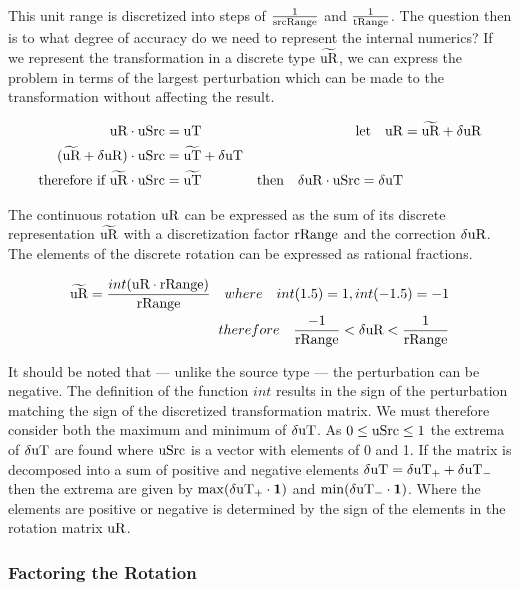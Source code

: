 This unit range is discretized into steps of $\frac{1}{\text{srcRange}}$ and $\frac{1}{\text{tRange}}$. The question then is to what degree of accuracy do we need to represent the internal numerics? If we represent the transformation in a discrete type $\widetilde{\text{uR}}$, we can express the problem in terms of the largest perturbation which can be made to the transformation without affecting the result.


\begin{equation}\label{eq:lxyPixel}
\begin{aligned}
\text{uR}  \cdot \text{uSrc} &= \text{uT}  &\text{let} \quad \text{uR} &= \widetilde{\text{uR}} + \delta\text{uR} \\
(\widetilde{\text{uR}} + \delta\text{uR})  \cdot \text{uSrc} &= \widetilde{\text{uT}} + \delta\text{uT} \\
\text{therefore if } \widetilde{\text{uR}} \cdot \text{uSrc} &= \widetilde{\text{uT}} & \text{then}\quad \delta\text{uR}  \cdot \text{uSrc} = \delta\text{uT}
\end{aligned} 
\end{equation}

The continuous rotation $\text{uR}$ can be expressed as the sum of its discrete representation $\widetilde{\text{uR}}$ with a discretization factor $\text{rRange}$ and the correction $\delta\text{uR}$. The elements of the discrete rotation can be expressed as rational fractions.

\begin{eqnarray}\label{eq:dRRange}
\widetilde{\text{uR}} = \dfrac{int(\text{uR} \cdot \text{rRange})}{\text{rRange}}\quad where\quad int(1.5) = 1, int (-1.5) = -1\\
therefore\quad \dfrac{-1}{\text{rRange}} < \delta\text{uR}  < \dfrac{1}{\text{rRange}}
\end{eqnarray}

It should be noted that --- unlike the source type \uSrc --- the perturbation can be negative. The definition of the function $int$ results in the sign of the perturbation matching the sign of the discretized transformation matrix. We must therefore consider both the maximum and minimum of $\delta\text{uT}$. As $0 \le\text{uSrc} \le 1$ the extrema of $\delta\text{uT}$ are found where $\text{uSrc}$ is a vector with elements of 0 and 1. If the matrix is decomposed into a sum of positive and negative elements $\delta\text{uT} = \delta\text{uT}_+ + \delta\text{uT}_-$ then the extrema are given by $\max(\delta\text{uT}_+ \cdot \mathbf{1})$ and $\min(\delta\text{uT}_- \cdot \mathbf{1})$. Where the elements are positive or negative is determined by the sign of the elements in the rotation matrix $\text{uR}$.

\subsubsection{Factoring the Rotation}

